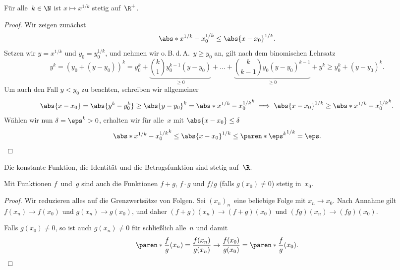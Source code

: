 \documentclass[a4paper]{article}
\begin{document}
\begin{proposition}
    Für alle~$k \in \N$ ist $x \mapsto x^{1/k}$ stetig auf~$\R^+$.
\end{proposition}

\begin{proof}
    Wir zeigen zunächst
    \begin{equation*}
        \abs*{x^{1/k}-x_0^{1/k}} \leq \abs{x-x_0}^{1/k}.
    \end{equation*}
    Setzen wir $y = x^{1/k}$ und $y_0 = y_0^{1/k}$, und nehmen wir o.\,B.\,d.\,A.\ $y \geq y_0$ an, gilt nach dem binomischen Lehrsatz
    \begin{equation*}
        y^k = (y_0 + (y-y_0))^k = y_0^k + \underbrace{\binom{k}{1}y_0^{k-1}(y-y_0)}_{\geq 0} + \dots + \underbrace{\binom{k}{k-1}y_0(y-y_0)^{k-1}}_{\geq 0} + y^k \geq y_0^k + (y-y_0)^k.
    \end{equation*}
    Um auch den Fall $y < y_0$ zu beachten, schreiben wir allgemeiner
    \begin{equation*}
        \abs{x-x_0} = \abs{y^k-y_0^k} \geq \abs{y-y_0}^k = \abs*{x^{1/k}-x_0^{1/k}}^k \implies \abs{x-x_0}^{1/k} \geq \abs*{x^{1/k}-x_0^{1/k}}^k.
    \end{equation*}
    Wählen wir nun $\delta = \eps^k > 0$, erhalten wir für alle~$x$ mit $\abs{x-x_0} \leq \delta$
    \begin{equation*}
        \abs*{x^{1/k}-x_0^{1/k}}^k \leq \abs{x-x_0}^{1/k} \leq \paren*{\eps^k}^{1/k} = \eps. \qedhere
    \end{equation*}
\end{proof}

\begin{proposition}
    Die konstante Funktion, die Identität und die Betragsfunktion sind stetig auf~$\R$.
\end{proposition}

\begin{proposition}
    Mit Funktionen $f$~und~$g$ sind auch die Funktionen $f+g$, $f\cdot g$ und $f/g$ (falls $g(x_0) \neq 0$) stetig in~$x_0$.
\end{proposition}

\begin{proof}
    Wir reduzieren alles auf die Grenzwertsätze von Folgen. Sei $(x_n)_n$~eine beliebige Folge mit $x_n \to x_0$. Nach Annahme gilt $f(x_n) \to f(x_0)$ und $g(x_n) \to g(x_0)$, und daher $(f+g)(x_n) \to (f+g)(x_0)$ und $(fg)(x_n) \to (fg)(x_0)$.

    Falls $g(x_0) \neq 0$, so ist auch $g(x_n) \neq 0$ für schließlich alle~$n$ und damit
    \begin{equation*}
        \paren*{\frac{f}{g}}(x_n) = \frac{f(x_n)}{g(x_n)} \to \frac{f(x_0)}{g(x_0)} = \paren*{\frac{f}{g}}(x_0). \qedhere
    \end{equation*}
\end{proof}
\end{document}
